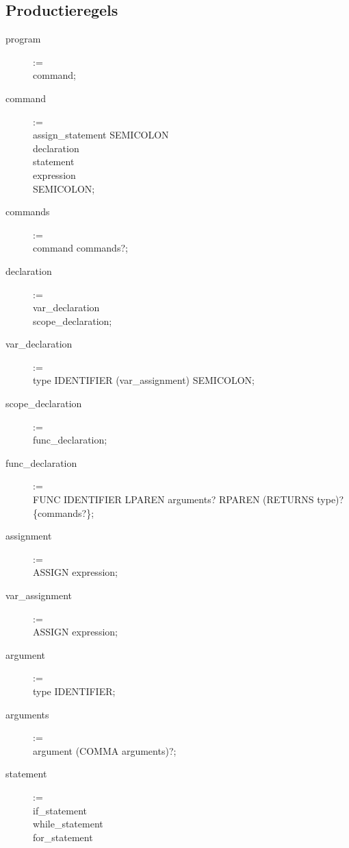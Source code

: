\subsection{Productieregels}
\begin{description}
    \item[program] := \hfill \\
        command;
    \item[command] := \hfill \\
        assign\_statement SEMICOLON \textbar \\
        declaration \textbar \\
        statement \textbar \\
        expression \textbar \\
        SEMICOLON;
    \item[commands] := \hfill \\
        command commands?;
    \item[declaration] := \hfill \\
        var\_declaration \textbar \\
        scope\_declaration;
    \item[var\_declaration] := \hfill \\
        type IDENTIFIER (var\_assignment) SEMICOLON;
    \item[scope\_declaration] := \hfill \\
        func\_declaration;
    \item[func\_declaration] := \hfill \\
        FUNC IDENTIFIER LPAREN arguments? RPAREN (RETURNS type)? \{commands?\};
    \item[assignment] := \hfill \\
        ASSIGN expression;
    \item[var\_assignment] := \hfill \\
        ASSIGN expression;
    \item[argument] := \hfill \\
        type IDENTIFIER;
    \item[arguments] := \hfill \\
        argument (COMMA arguments)?;
    \item[statement] := \hfill \\
        if\_statement \textbar \\ 
        while\_statement \textbar \\
        for\_statement \textbar \\

\end{description}
